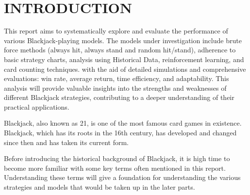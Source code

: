 \documentclass[a4paper,12pt]{report}
\begin{document}
\tableofcontents

\listoffigures

\chapter{INTRODUCTION}
\label{chapter:introduction}

This report aims to systematically explore and evaluate the performance of various Blackjack-playing models. The models under investigation include brute force methods (always hit, always stand and random hit/stand), adherence to basic strategy charts, analysis using Historical Data, reinforcement learning, and card counting techniques. with the aid of detailed simulations and comprehensive evaluations: win rate, average return, time efficiency, and adaptability. This analysis will provide valuable insights into the strengths and weaknesses of different Blackjack strategies, contributing to a deeper understanding of their practical applications.

Blackjack, also known as 21, is one of the most famous card games in existence. Blackjack, which has its roots in the 16th century, has developed and changed since then and has taken its current form.

Before introducing the historical background of Blackjack, it is high time to become more familiar with some key terms often mentioned in this report. Understanding these terms will give a foundation for understanding the various strategies and models that would be taken up in the later parts.
\end{document}

